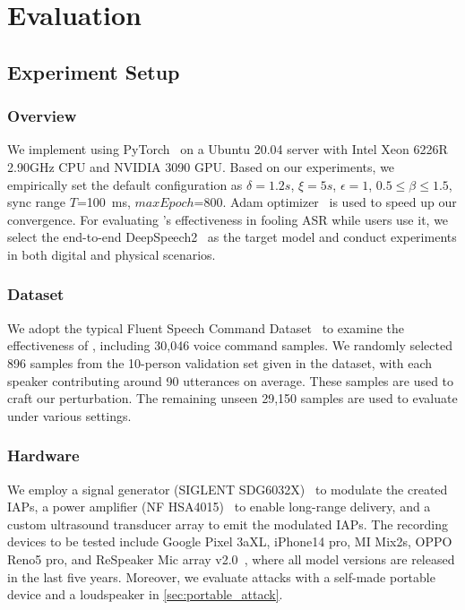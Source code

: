 
\section{Evaluation}
\subsection{Experiment Setup}
\subsubsection{Overview} We implement \alias using PyTorch~\cite{pytorch} on a Ubuntu 20.04 server with Intel Xeon 6226R 2.90GHz CPU and NVIDIA 3090 GPU. Based on our experiments, we empirically set the default configuration as $\delta=1.2s$, $\xi=5s$, $\epsilon=1$, $0.5\le\beta\le1.5$, sync range $T$=100~ms, $maxEpoch$=800. Adam optimizer~\cite{kingma2014adam} is used to speed up our convergence.
For evaluating \alias's effectiveness in fooling ASR while users use it, we select the end-to-end DeepSpeech2~\cite{amodei2016deep} as the target model and conduct experiments in both digital and physical scenarios.

\subsubsection{Dataset}\label{sec:eval_dataset} We adopt the typical Fluent Speech Command Dataset~\cite{fluent2020commands} to examine the effectiveness of \alias, including 30,046 voice command samples. 
We randomly selected 896 samples from the 10-person validation set given in the dataset, with each speaker contributing around 90 utterances on average. These samples are used to craft our perturbation. The remaining unseen 29,150 samples are used to evaluate \alias under various settings. %

\subsubsection{Hardware} We employ a signal generator (SIGLENT SDG6032X)~\cite{siglent} to modulate the created IAPs, a power amplifier (NF HSA4015)~\cite{amplifierHSA4015} to enable long-range delivery, and a custom ultrasound transducer array to emit the modulated IAPs. The recording devices to be tested include Google Pixel 3aXL, iPhone14 pro, MI Mix2s, OPPO Reno5 pro, and ReSpeaker Mic array v2.0~\cite{respeaker}, where all model versions are released in the last five years. Moreover, we evaluate attacks with a self-made portable device and a loudspeaker in \textsection\ref{sec:portable_attack}.

